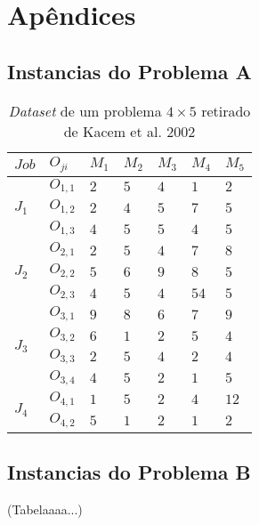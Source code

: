 \chapter{Apêndices}

\appendix

\label{apd:problem-instances}

\section{Instancias do Problema A}
\label{apd:problem-instance-a}
\begin{table}[htb]
\centering
\caption{\textit{Dataset} de um problema $4\times5$ retirado de Kacem et al. 2002}
\begin{tabular}{lllllll}
\hline
$Job$ & $O_{ji}$ & $M_1$ & $M_2$ & $M_3$ & $M_4$ & $M_5$ \\ \hline
\multirow{3}{*}{$J_1$}  & $O_{1,1}$ & $2$ & $5$ & $4$ & $1$ & $2$ \\
                        & $O_{1,2}$ & $2$ & $4$ & $5$ & $7$ & $5$ \\
                        & $O_{1,3}$ & $4$ & $5$ & $5$ & $4$ & $5$ \\
\multirow{3}{*}{$J_2$}  & $O_{2,1}$ & $2$ & $5$ & $4$ & $7$ & $8$ \\
                        & $O_{2,2}$ & $5$ & $6$ & $9$ & $8$ & $5$ \\
                        & $O_{2,3}$ & $4$ & $5$ & $4$ & $54$& $5$ \\
\multirow{4}{*}{$J_3$}  & $O_{3,1}$ & $9$ & $8$ & $6$ & $7$ & $9$ \\
                        & $O_{3,2}$ & $6$ & $1$ & $2$ & $5$ & $4$ \\
                        & $O_{3,3}$ & $2$ & $5$ & $4$ & $2$ & $4$ \\
                        & $O_{3,4}$ & $4$ & $5$ & $2$ & $1$ & $5$ \\
\multirow{2}{*}{$J_4$}  & $O_{4,1}$ & $1$ & $5$ & $2$ & $4$ & $12$ \\
                        & $O_{4,2}$ & $5$ & $1$ & $2$ & $1$ & $2$ \\ \hline
\end{tabular}%
\end{table}
\section{Instancias do Problema B}
\label{apd:problem-instance-b}
    (Tabelaaaa...)

